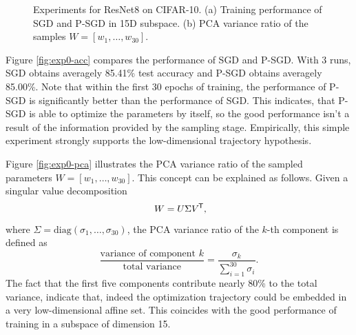 \documentclass[11pt, a4paper]{article}
\newcommand*{\tr}{^{\mkern-1.5mu\mathsf{T}}}
\begin{document}
\begin{figure}[!h]
\centering
{}
\caption{\centering Experiments for ResNet8 on CIFAR-10. (a) Training performance of SGD and P-SGD in 15D subspace. (b) PCA variance ratio of the samples $W = [w_1, \dots, w_{30}]$. }
\label{fig:exp1}
\end{figure}

Figure \ref{fig:exp0-acc} compares the performance of SGD and P-SGD. With 3 runs, SGD obtains averagely 85.41\% test accuracy and P-SGD obtains averagely 85.00\%. Note that within the first 30 epochs of training, the performance of P-SGD is significantly better than the performance of SGD.  This indicates, that P-SGD is able to optimize the parameters by itself, so the good performance isn't a result of the information provided by the sampling stage. Empirically, this simple experiment strongly supports the low-dimensional trajectory hypothesis.

Figure \ref{fig:exp0-pca} illustrates the PCA variance ratio of the sampled parameters $W = [w_1, \dots, w_{30}]$. This concept can be explained as follows. Given a singular value decomposition
\[ W = U \Sigma V\tr, \]
where $\Sigma = \text{diag}(\sigma_1, \dots, \sigma_{30})$, the PCA variance ratio of the $k$-th component is defined as
\[ \frac{\text{variance of component } k}{\text{total variance}} = \frac{\sigma_k}{\sum_{i=1}^{30}\sigma_i}. \]
The fact that the first five components contribute nearly 80\% to the total variance, indicate that, indeed the optimization trajectory could be embedded in a very low-dimensional affine set. This coincides with the good performance of training in a subspace of dimension 15.
\end{document}
